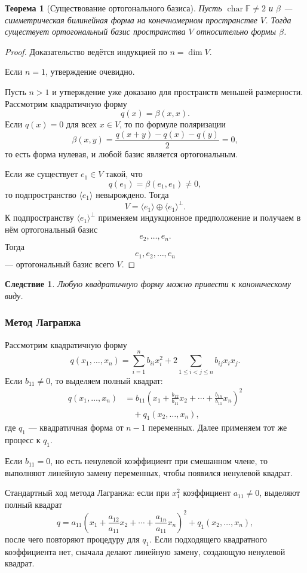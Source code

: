 \documentclass[12pt,a4paper]{article}
\theoremstyle{definition}
\theoremstyle{plain}
\newtheorem{theorem}[definition]{Теорема}
\newtheorem{corollary}[definition]{Следствие}
\theoremstyle{remark}
\newenvironment{knowledgefix}{\begin{clarifybox}}{\end{clarifybox}}
\newcommand{\F}{\mathbb{F}}
\begin{document}
\begin{theorem}[Существование ортогонального базиса]
Пусть $\operatorname{char}\F\ne2$ и $\beta$ --- симметрическая билинейная форма на конечномерном пространстве $V$.
Тогда существует ортогональный базис пространства $V$ относительно формы $\beta$.
\end{theorem}

\begin{proof}
Доказательство ведётся индукцией по $n=\dim V$.

Если $n=1$, утверждение очевидно.

Пусть $n>1$ и утверждение уже доказано для пространств меньшей размерности.
Рассмотрим квадратичную форму
\[
    q(x)=\beta(x,x).
\]
Если $q(x)=0$ для всех $x\in V$, то по формуле поляризации
\[
    \beta(x,y)=\frac{q(x+y)-q(x)-q(y)}{2}=0,
\]
то есть форма нулевая, и любой базис является ортогональным.

Если же существует $e_1\in V$ такой, что
\[
    q(e_1)=\beta(e_1,e_1)\ne0,
\]
то подпространство $\langle e_1\rangle$ невырождено. Тогда
\[
    V=\langle e_1\rangle\oplus \langle e_1\rangle^\perp.
\]
К подпространству $\langle e_1\rangle^\perp$ применяем индукционное предположение и получаем в нём ортогональный базис
\[
    e_2,\ldots,e_n.
\]
Тогда
\[
    e_1,e_2,\ldots,e_n
\]
--- ортогональный базис всего $V$.
\end{proof}

\begin{corollary}
Любую квадратичную форму можно привести к каноническому виду.
\end{corollary}

\subsubsection*{Метод Лагранжа}

Рассмотрим квадратичную форму
\[
    q(x_1,\ldots,x_n)
    =\sum_{i=1}^n b_{ii}x_i^2
    +2\sum_{1\le i<j\le n} b_{ij}x_ix_j.
\]
Если $b_{11}\ne0$, то выделяем полный квадрат:
\[
\begin{aligned}
    q(x_1,\ldots,x_n)
    &=b_{11}\left(x_1+\frac{b_{12}}{b_{11}}x_2+\cdots+\frac{b_{1n}}{b_{11}}x_n\right)^2 \\
    &\quad + q_1(x_2,\ldots,x_n),
\end{aligned}
\]
где $q_1$ --- квадратичная форма от $n-1$ переменных.
Далее применяем тот же процесс к $q_1$.

Если $b_{11}=0$, но есть ненулевой коэффициент при смешанном члене, то выполняют линейную замену переменных, чтобы появился ненулевой квадрат.
\begin{knowledgefix}
Стандартный ход метода Лагранжа: если при \(x_1^2\) коэффициент \(a_{11}\ne0\), выделяют полный квадрат
\[q=a_{11}\left(x_1+\frac{a_{12}}{a_{11}}x_2+\cdots+\frac{a_{1n}}{a_{11}}x_n\right)^2+q_1(x_2,
\ldots,x_n),\]
после чего повторяют процедуру для \(q_1\). Если подходящего квадратного коэффициента нет, сначала делают линейную замену, создающую ненулевой квадрат.
\end{knowledgefix}
\end{document}
